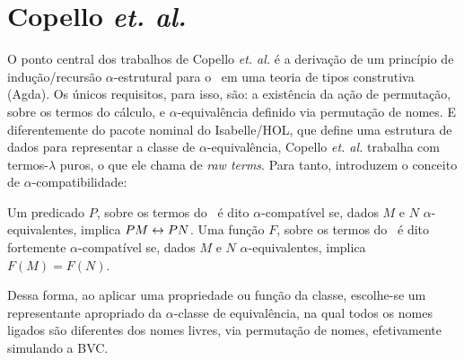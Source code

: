 \section{Copello \textit{et. al.}}\label{sec:copello}
O ponto central dos trabalhos de Copello \textit{et. al.} \cite{Copello2016,Copello2018} é a derivação de um princípio de indução/recursão $\alpha$-estrutural para o \lcalc~em uma teoria de tipos construtiva (Agda). Os únicos requisitos, para isso, são: a existência da ação de permutação, sobre os termos do cálculo, e $\alpha$-equivalência definido via permutação de nomes. E diferentemente do pacote nominal do Isabelle/HOL, que define uma estrutura de dados para representar a classe de $\alpha$-equivalência, Copello \textit{et. al.} trabalha com termos-$\lambda$ puros, o que ele chama de \textit{raw terms}. Para tanto, introduzem o conceito de $\alpha$-compatibilidade:
\begin{definicao}\label{def:alpha-compatibilidade}
Um predicado $P$, sobre os termos do \lcalc~é dito $\alpha$-compatível se, dados $M$ e $N$ $\alpha$-equivalentes, implica $P M \leftrightarrow P N$.
Uma função $F$, sobre os termos do \lcalc~é dito fortemente $\alpha$-compatível se, dados $M$ e $N$ $\alpha$-equivalentes, implica $F(M) = F(N)$.
\end{definicao}\noindent
Dessa forma, ao aplicar uma propriedade ou função da classe, escolhe-se um representante apropriado da $\alpha$-classe de equivalência, na qual todos os nomes ligados são diferentes dos nomes livres, via permutação de nomes, efetivamente simulando a BVC.

